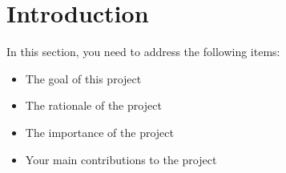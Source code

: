 \section{Introduction}

In this section, you need to address the following items:

\begin{itemize}
\item The goal of this project
\item The rationale of the project 
\item The importance of the project
\item Your main contributions to the project  
\end{itemize}

